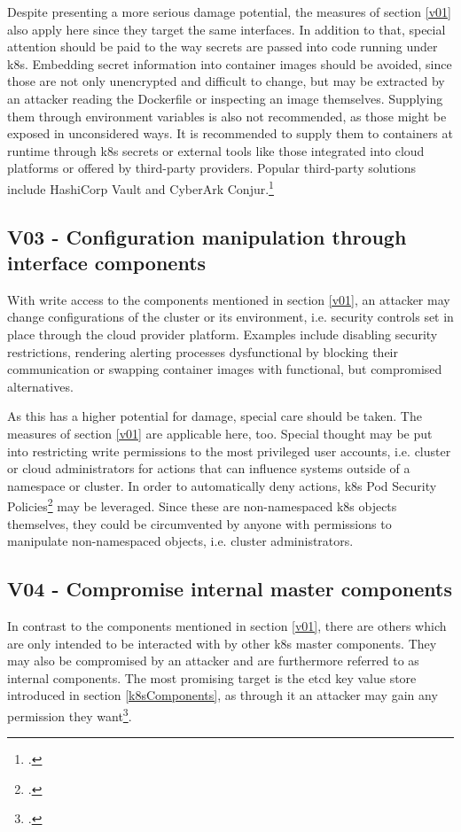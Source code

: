 Despite presenting a more serious damage potential, the measures of section \ref{v01} also apply here since they target the same interfaces.
In addition to that, special attention should be paid to the way secrets are passed into code running under \gls{k8s}. Embedding secret information into container images should be avoided, since those are not only unencrypted and difficult to change, but may be extracted by an attacker reading the Dockerfile or inspecting an image themselves. Supplying them through environment variables is also not recommended, as those might be exposed in unconsidered ways. It is recommended to supply them to containers at runtime through \gls{k8s} secrets or external tools like those integrated into cloud platforms or offered by third-party providers. Popular third-party solutions include HashiCorp Vault and CyberArk Conjur.\footcite[][, chapter 7]{k8sBook}

\subsection{V03 - Configuration manipulation through interface components} \label{v03}
With write access to the components mentioned in section \ref{v01}, an attacker may change configurations of the cluster or its environment, i.e. security controls set in place through the cloud provider platform. Examples include disabling security restrictions, rendering alerting processes dysfunctional by blocking their communication or swapping container images with functional, but compromised alternatives.

As this has a higher potential for damage, special care should be taken. The measures of section \ref{v01} are applicable here, too. Special thought may be put into restricting write permissions to the most privileged user accounts, i.e. cluster or cloud administrators for actions that can influence systems outside of a namespace or cluster.
In order to automatically deny actions, \gls{k8s} Pod Security Policies\footcite[][, section 'What is a Pod Security Policy?']{securityPolicy} may be leveraged. Since these are non-namespaced \gls{k8s} objects themselves, they could be circumvented by anyone with permissions to manipulate non-namespaced objects, i.e. cluster administrators.

\subsection{V04 - Compromise internal master components}
In contrast to the components mentioned in section \ref{v01}, there are others which are only intended to be interacted with by other \gls{k8s} master components. They may also be compromised by an attacker and are furthermore referred to as internal components.
The most promising target is the etcd key value store introduced in section \ref{k8sComponents}, as through it an attacker may gain any permission they want\footcite[][, chapter 'Running etcd Safely']{k8sBook}.

